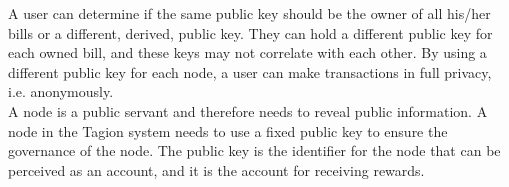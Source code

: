 A user can determine if the same public key should be the owner of all his/her bills or a different, derived, public key. They can hold a different public key for each owned bill, and these keys may not correlate with each other. By using a different public key for each node, a user can make transactions in full privacy, i.e. anonymously.\\ 
A node is a public servant and therefore needs to reveal public information. A node in the Tagion system needs to use a fixed public key to ensure the governance of the node. The public key is the identifier for the node that can be perceived as an account, and it is the account for receiving rewards.\\ 
